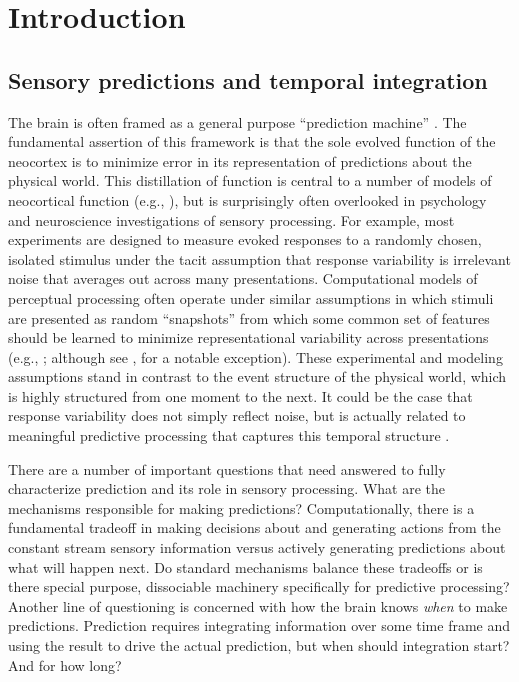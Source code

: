 \documentclass[dwyatte_dissertation.tex]{subfiles}
\begin{document}
\sloppy

\chapter{Introduction}
\label{chap:intro}

\section{Sensory predictions and temporal integration}
The brain is often framed as a general purpose ``prediction machine'' \cite{HawkinsBlakeslee04,Clark13}. The fundamental assertion of this framework is that the sole evolved function of the neocortex is to minimize error in its representation of predictions about the physical world. This distillation of function is central to a number of models of neocortical function (e.g., ), but is surprisingly often overlooked in psychology and neuroscience investigations of sensory processing. For example, most experiments are designed to measure evoked responses to a randomly chosen, isolated stimulus under the tacit assumption that response variability is irrelevant noise that averages out across many presentations. Computational models of perceptual processing often operate under similar assumptions in which stimuli are presented as random ``snapshots'' from which some common set of features should be learned to minimize representational variability across presentations (e.g., ; although see , for a notable exception). These experimental and modeling assumptions stand in contrast to the event structure of the physical world, which is highly structured from one moment to the next. It could be the case that response variability does not simply reflect noise, but is actually related to meaningful predictive processing that captures this temporal structure \cite{ArieliSterkinGrinvaldEtAl96,WilderJonesAhmedEtAl13,FischerWhitney14}.

There are a number of important questions that need answered to fully characterize prediction and its role in sensory processing. What are the mechanisms responsible for making predictions? Computationally, there is a fundamental tradeoff in making decisions about and generating actions from the constant stream sensory information versus actively generating predictions about what will happen next. Do standard mechanisms balance these tradeoffs or is there special purpose, dissociable machinery specifically for predictive processing? Another line of questioning is concerned with how the brain knows \textit{when} to make predictions. Prediction requires integrating information over some time frame and using the result to drive the actual prediction, but when should integration start? And for how long? 
\end{document}
